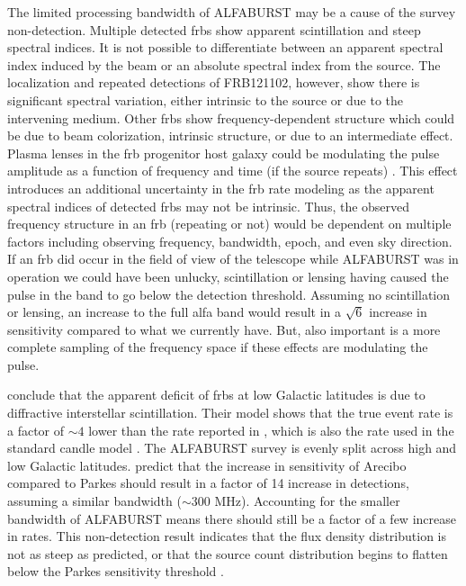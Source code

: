 \documentclass[a4paper,fleqn,usenatbib]{mnras}
\begin{document}
The limited processing bandwidth of ALFABURST may be a cause of the survey
non-detection. Multiple detected \glspl{frb} show apparent scintillation and
steep spectral indices. It is not possible to differentiate between an apparent
spectral index induced by the beam or an absolute spectral index from the
source. The localization and repeated detections of FRB121102, however, show
there is significant spectral variation, either intrinsic to the source or due
to the intervening medium. Other \glspl{frb} show frequency-dependent structure
which could be due to beam colorization, intrinsic structure, or due to an
intermediate effect. Plasma lenses in the \gls{frb} progenitor host galaxy could
be modulating the pulse amplitude as a function of frequency and time (if the
source repeats) \citep{2017ApJ...842...35C}. This effect introduces an
additional uncertainty in the \gls{frb} rate modeling as the apparent spectral
indices of detected \glspl{frb} may not be intrinsic. Thus, the observed
frequency structure in an \gls{frb} (repeating or not) would be dependent on
multiple factors including observing frequency, bandwidth, epoch, and even sky
direction. If an \gls{frb} did occur in the field of view of the telescope while
ALFABURST was in operation we could have been unlucky, scintillation or lensing
having caused the pulse in the band to go below the detection threshold.
Assuming no scintillation or lensing, an increase to the full \gls{alfa} band
would result in a $\sqrt{6}$ increase in sensitivity compared to what we
currently have. But, also important is a more complete sampling of the frequency
space if these effects are modulating the pulse.

\cite{2015MNRAS.451.3278M} conclude that the apparent deficit of \glspl{frb} at
low Galactic latitudes is due to diffractive interstellar scintillation. Their
model shows that the true event rate is a factor of $\sim 4$ lower than the rate
reported in \cite{2013Sci...341...53T}, which is also the rate used in the
standard candle model \citep{2013MNRAS.436L...5L}. The ALFABURST survey is
evenly split across high and low Galactic latitudes.  \cite{2015MNRAS.451.3278M}
predict that the increase in sensitivity of Arecibo compared to Parkes should
result in a factor of 14 increase in detections, assuming a similar bandwidth
($\sim 300$ MHz). Accounting for the smaller bandwidth of ALFABURST means there
should still be a factor of a few increase in rates. This non-detection result
indicates that the \cite{2015MNRAS.451.3278M} flux density distribution is not
as steep as predicted, or that the source count distribution begins to
flatten below the Parkes sensitivity threshold \citep[for further discussion on
FRB source counts, see][]{2017arXiv171011493M}.
\end{document}

